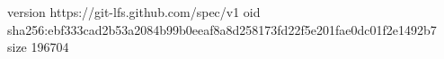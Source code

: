 version https://git-lfs.github.com/spec/v1
oid sha256:ebf333cad2b53a2084b99b0eeaf8a8d258173fd22f5e201fae0dc01f2e1492b7
size 196704
